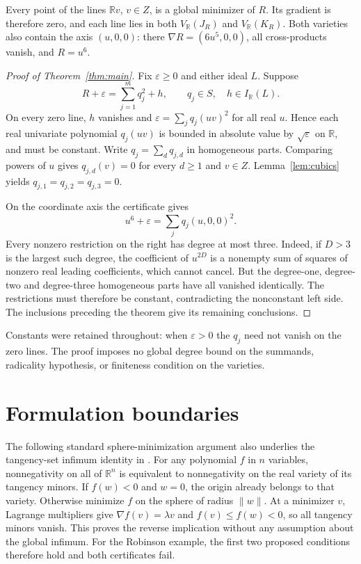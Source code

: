 \documentclass[11pt]{article}
\begin{document}
Every point of the lines $\mathbb Rv$, $v\in Z$, is a global minimizer of $R$.
Its gradient is therefore zero, and each line lies in both $V_{\mathbb R}(J_R)$
and $V_{\mathbb R}(K_R)$. Both varieties also contain the axis $(u,0,0)$:
there $\nabla R=(6u^5,0,0)$, all cross-products vanish, and $R=u^6$.

\begin{proof}[Proof of Theorem~\ref{thm:main}]
Fix $\varepsilon\ge0$ and either ideal $L$. Suppose
\[
 R+\varepsilon=\sum_{j=1}^m q_j^2+h,
 \qquad q_j\in S,\quad h\in I_{\mathbb R}(L).
\]
On every zero line, $h$ vanishes and
$\varepsilon=\sum_j q_j(uv)^2$ for all real $u$. Hence each real univariate
polynomial $q_j(uv)$ is bounded in absolute value by $\sqrt\varepsilon$ on
$\mathbb R$, and must be constant. Write $q_j=\sum_d q_{j,d}$ in homogeneous
parts. Comparing powers of $u$ gives $q_{j,d}(v)=0$ for every $d\ge1$ and
$v\in Z$. Lemma~\ref{lem:cubics} yields
$q_{j,1}=q_{j,2}=q_{j,3}=0$.

On the coordinate axis the certificate gives
\[
 u^6+\varepsilon=\sum_j q_j(u,0,0)^2.
\]
Every nonzero restriction on the right has degree at most three. Indeed, if
$D>3$ is the largest such degree, the coefficient of $u^{2D}$ is a nonempty
sum of squares of nonzero real leading coefficients, which cannot cancel.
But the degree-one, degree-two and degree-three homogeneous parts have all
vanished identically. The restrictions must therefore be constant, contradicting
the nonconstant left side. The inclusions preceding the theorem give its
remaining conclusions.
\end{proof}
Constants were retained throughout: when $\varepsilon>0$ the $q_j$ need not
vanish on the zero lines. The proof imposes no global degree bound on the
summands, radicality hypothesis, or finiteness condition on the varieties.

\section{Formulation boundaries}
The following standard sphere-minimization argument also underlies the
tangency-set infimum identity in \cite[Section~7.2.3, Lemma~7.21]{laurent}.
For any polynomial $f$ in $n$ variables, nonnegativity on all of $\mathbb R^n$
is equivalent to nonnegativity on the real variety of its tangency minors.
If $f(w)<0$ and $w=0$, the origin already belongs to that variety. Otherwise
minimize $f$ on the sphere of radius $\|w\|$. At a minimizer $v$, Lagrange
multipliers give $\nabla f(v)=\lambda v$ and $f(v)\le f(w)<0$, so all tangency
minors vanish. This proves the reverse implication without any assumption
about the global infimum. For the Robinson example, the first two proposed
conditions therefore hold and both certificates fail.
\end{document}

